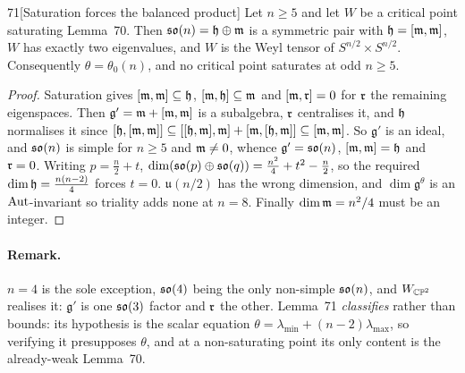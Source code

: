 \begin{Lem}{71}[Saturation forces the balanced product]
Let $n\ge5$ and let $W$ be a critical point saturating Lemma~70. Then $\mathfrak{so}(n)=\mathfrak{h}\oplus\mathfrak{m}$ is a symmetric pair with $\mathfrak{h}=[\mathfrak{m},\mathfrak{m}]$, $W$ has exactly two eigenvalues, and $W$ is the Weyl tensor of $S^{n/2}\times S^{n/2}$. Consequently $\theta=\theta_0(n)$, and no critical point saturates at odd $n\ge5$.
\end{Lem}

\begin{proof}
Saturation gives $[\mathfrak{m},\mathfrak{m}]\subseteq\mathfrak{h}$, $[\mathfrak{m},\mathfrak{h}]\subseteq\mathfrak{m}$ and $[\mathfrak{m},\mathfrak{r}]=0$ for $\mathfrak{r}$ the remaining eigenspaces. Then $\mathfrak{g}'=\mathfrak{m}+[\mathfrak{m},\mathfrak{m}]$ is a subalgebra, $\mathfrak{r}$ centralises it, and $\mathfrak{h}$ normalises it since $[\mathfrak{h},[\mathfrak{m},\mathfrak{m}]]\subseteq[[\mathfrak{h},\mathfrak{m}],\mathfrak{m}]+[\mathfrak{m},[\mathfrak{h},\mathfrak{m}]]\subseteq[\mathfrak{m},\mathfrak{m}]$. So $\mathfrak{g}'$ is an ideal, and $\mathfrak{so}(n)$ is simple for $n\ge5$ and $\mathfrak{m}\ne0$, whence $\mathfrak{g}'=\mathfrak{so}(n)$, $[\mathfrak{m},\mathfrak{m}]=\mathfrak{h}$ and $\mathfrak{r}=0$. Writing $p=\tfrac n2+t$, $\dim(\mathfrak{so}(p)\oplus\mathfrak{so}(q))=\tfrac{n^2}4+t^2-\tfrac n2$, so the required $\dim\mathfrak{h}=\tfrac{n(n-2)}4$ forces $t=0$. $\mathfrak u(n/2)$ has the wrong dimension, and $\dim\mathfrak{g}^\theta$ is an $\mathrm{Aut}$-invariant so triality adds none at $n=8$. Finally $\dim\mathfrak{m}=n^2/4$ must be an integer.
\end{proof}

\paragraph{Remark.}
$n=4$ is the sole exception, $\mathfrak{so}(4)$ being the only non-simple $\mathfrak{so}(n)$, and $W_{\mathbb{CP}^2}$ realises it: $\mathfrak{g}'$ is one $\mathfrak{so}(3)$ factor and $\mathfrak{r}$ the other. Lemma~71 \emph{classifies} rather than bounds: its hypothesis is the scalar equation $\theta=\lambda_{\min}+(n-2)\lambda_{\max}$, so verifying it presupposes $\theta$, and at a non-saturating point its only content is the already-weak Lemma~70.

